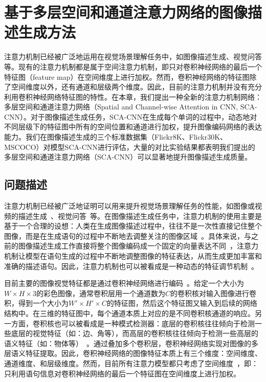 \chapter{基于多层空间和通道注意力网络的图像描述生成方法}

注意力机制已经被广泛地运用在视觉场景理解任务中，如图像描述生成、视觉问答等。现有的注意力机制都是属于空间注意力机制，即只对卷积神经网络的最后一个特征图（feature map）在空间维度上进行加权。然而，卷积神经网络的特征图除了空间维度以外，还有通道和层级两个维度。因此，目前的注意力机制并没有充分利用卷积神经网络特征图的特性。在本章，我们提出一种全新的注意力机制网络：多层空间和通道注意力网络（Spatial and Channel-wise Attention in CNN, SCA-CNN）。对于图像描述生成任务，SCA-CNN在生成每个单词的过程中，动态地对不同层级下的特征图中所有的空间位置和通道进行加权，提升图像编码网络的表达能力。我们在图像描述生成的三个标准数据集（Flickr8K、Flickr30K、MSCOCO）对模型SCA-CNN进行评估，大量的对比实验结果都表明我们提出的多层空间和通道注意力网络（SCA-CNN）可以显著地提升图像描述生成质量。


\section{问题描述}

注意力机制已经被广泛地证明可以用来提升视觉场景理解任务的性能，如图像或视频的描述生成~\cite{xu2015show,yao2015describing}、视觉问答~\cite{chen2016abc,yang2016stacked,xu2016ask}等。在图像描述生成任务中，注意力机制的使用主要是基于一个合理的设想：人类在生成图像描述过程中，往往不是一次性直接记住整个图像，而是在生成语句的过程中不断地去调整关注的图像区域~\cite{corbetta2002control}。具体来说，与之前的图像描述生成工作直接将整个图像编码成一个固定的向量表达不同~\cite{vinyals2015show,karpathy2015deep}，注意力机制让模型在语句生成的过程中不断地调整图像的特征表达，从而生成更加丰富和准确的描述语句。因此，注意力机制也可以被看成是一种动态的特征调节机制~\cite{mnih2014recurrent,stollenga2014deep}。

目前主要的图像视觉特征都是通过卷积神经网络进行编码~\cite{he2016deep,simonyan2015very}。给定一个大小为$W\times H\times 3$的彩色图像，通常卷积层用一个通道数为$C$的卷积核对输入图像进行卷积，得到一个大小为$W'\times H'\times C$的特征图，然后这个特征图又输入到后续的网络结构中。在三维的特征图中，每个通道本质上对应的是不同卷积核通道的响应。另一方面，卷积核也可以被看成是一种模式检测器：底层的卷积核往往倾向于检测一些底层的视觉特征（如：边、角等），而高层的卷积核往往倾向于检测一些高层的语义特征（如：物体等）~\cite{zeiler2014visualizing}。通过叠加多个卷积层，卷积神经网络实现对图像的多层语义特征提取。因此，卷积神经网络的图像特征本质上有三个维度：空间维度、通道维度、和层级维度。然而，目前所有注意力模型都只考虑了空间维度~\cite{xu2015show}，即：只利用语句信息对卷积神经网络的最后一个特征图在空间维度上进行加权。

